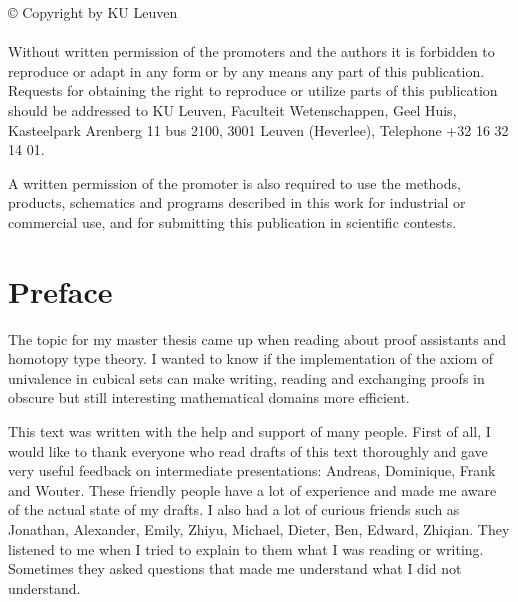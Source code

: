 \documentclass[12pt,a4paper,twoside,xetex]{book} %
\begin{document}
\rmfamily



\thispagestyle{empty}



\null

\vfill

\begin{footnotesize}
© Copyright by KU Leuven \\ \\

Without written permission of the promoters and the authors it is forbidden to reproduce or adapt in any form or by any means any part of this publication. Requests for obtaining the right to reproduce or utilize parts of this publication should be addressed to KU Leuven, Faculteit Wetenschappen, Geel Huis, Kasteelpark Arenberg 11 bus 2100, 3001 Leuven (Heverlee), Telephone +32 16 32 14 01.

A written permission of the promoter is also required to use the methods, products, schematics and programs described in this work for industrial or commercial use, and for submitting this publication in scientific contests.
\end{footnotesize}


\clearpage 

\clearpage

\setcounter{page}{0}

\chapter*{Preface}

The topic for my master thesis came up when reading about proof assistants and homotopy type theory. I wanted to know if the implementation of the axiom of 
univalence in cubical sets can make writing, reading and exchanging proofs in obscure but still interesting mathematical domains more efficient.

This text was written with the help and support of many people. First of all, I 
would like to thank everyone who read drafts of this text thoroughly and gave 
very useful feedback on intermediate presentations: Andreas, Dominique, Frank and Wouter. These friendly people have a lot of experience and made me aware of the actual state of my drafts. I also had a lot of curious friends such as Jonathan, Alexander, Emily, Zhiyu, Michael, Dieter, Ben, Edward, Zhiqian.  They listened to me when I tried to explain to them what I was reading or writing. Sometimes they asked questions 
that made me understand what I did not understand.
\\
\end{document}
